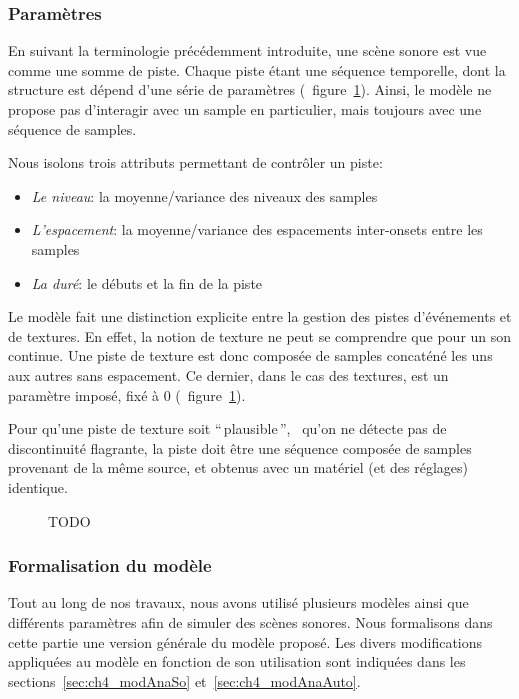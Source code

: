 \subsubsection{Paramètres}
\label{sec:ch4_modelParam}

En suivant la terminologie précédemment introduite, une scène sonore est vue comme une somme de piste. Chaque piste étant une séquence temporelle, dont la structure est dépend d'une série de paramètres (\cf~figure~\ref{fig:modelSequence}). Ainsi, le modèle ne propose pas d’interagir avec un sample en particulier, mais toujours avec une séquence de samples.

Nous isolons trois attributs permettant de contrôler un piste:

\begin{itemize}
\item \emph{Le niveau}: la moyenne/variance des niveaux des samples
\item \emph{L'espacement}: la moyenne/variance des espacements inter-onsets entre les samples
\item \emph{La duré}: le débuts et la fin de la piste
\end{itemize}

Le modèle fait une distinction explicite entre la gestion des pistes d'événements et de textures. En effet, la notion de texture ne peut se comprendre que pour un son continue. Une piste de texture est donc composée de samples concaténé les uns aux autres sans espacement. Ce dernier, dans le cas des textures, est un paramètre imposé, fixé à 0 (\cf~figure~\ref{fig:modelSequence}). 

Pour qu'une piste de texture soit ``\,plausible\,'', \ie~qu'on ne détecte pas de discontinuité flagrante, la piste doit être une séquence composée de samples provenant de la même source, et obtenus avec un matériel (et des réglages) identique.

\begin{figure}[bth]
        \graphicspath{{gfx/}}
        \myfloatalign
        \def\svgwidth{\linewidth}
        
       \caption{TODO}\label{fig:modelSequence}
\end{figure}

\subsubsection{Formalisation du modèle}
 \label{sec:ch4_modelForm}
 
 Tout au long de nos travaux, nous avons utilisé plusieurs modèles ainsi que différents paramètres afin de simuler des scènes sonores. Nous formalisons dans cette partie une version générale du modèle proposé. Les divers modifications appliquées au modèle en fonction de son utilisation sont indiquées dans les sections~\ref{sec:ch4_modAnaSo} et~\ref{sec:ch4_modAnaAuto}.
 
